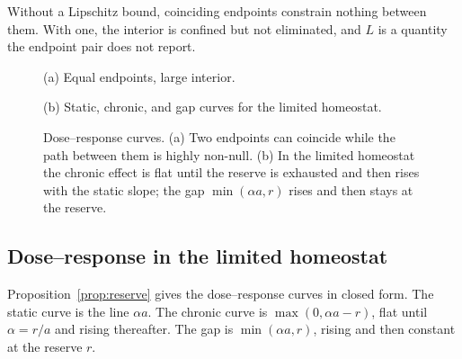 \documentclass[11pt]{article}
\theoremstyle{definition}
\theoremstyle{remark}
\begin{document}
Without a Lipschitz bound, coinciding endpoints constrain nothing between them. With one, the interior is confined but not eliminated, and $L$ is a quantity the endpoint pair does not report.

\begin{figure}[ht]
\centering
\begin{minipage}{0.48\textwidth}
\centering
{}

\small(a) Equal endpoints, large interior.
\end{minipage}\hfill
\begin{minipage}{0.48\textwidth}
\centering
{}

\small(b) Static, chronic, and gap curves for the limited homeostat.
\end{minipage}
\caption{Dose--response curves. (a) Two endpoints can coincide while the path between them is highly non-null. (b) In the limited homeostat the chronic effect is flat until the reserve is exhausted and then rises with the static slope; the gap $\min(\alpha a,r)$ rises and then stays at the reserve.}
\end{figure}

\subsection{Dose--response in the limited homeostat}

Proposition~\ref{prop:reserve} gives the dose--response curves in closed form. The static curve is the line $\alpha a$. The chronic curve is $\max(0,\alpha a-r)$, flat until $\alpha=r/a$ and rising thereafter. The gap is $\min(\alpha a,r)$, rising and then constant at the reserve $r$.
\end{document}
